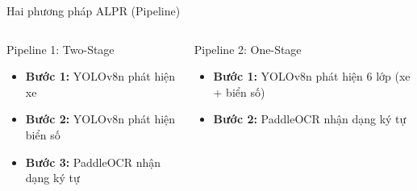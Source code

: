 \begin{frame}{Hai phương pháp ALPR (Pipeline)}
    \begin{columns}
        \begin{block}{Pipeline 1: Two-Stage}
        \begin{itemize}
            \item \textbf{Bước 1:} YOLOv8n phát hiện xe
            \item \textbf{Bước 2:} YOLOv8n phát hiện biển số
            \item \textbf{Bước 3:} PaddleOCR nhận dạng ký tự
        \end{itemize}
        \end{block}

        \begin{block}{Pipeline 2: One-Stage}
        \begin{itemize}
            \item \textbf{Bước 1:} YOLOv8n phát hiện 6 lớp (xe + biển số)
            \item \textbf{Bước 2:} PaddleOCR nhận dạng ký tự
        \end{itemize}
        \vspace{0.5em}
        \end{block}
    \end{columns}
\end{frame}
